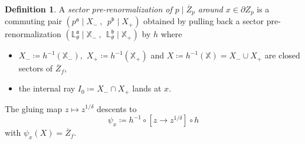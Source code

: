\documentclass[]{amsart}
\renewcommand{\sp}{{\ \ }}
\renewcommand{\aa}{{\mathfrak{a}}}
\newcommand{\bb}{{\mathfrak{b}}}
\newcommand{\Lbb}{{\mathbb L}}
\newcommand{\Sbb}{{\mathbb X}}
\theoremstyle{remark}
\numberwithin{equation}{section}
\theoremstyle{definition}
\newtheorem{defn}[thm]{Definition}
\begin{document}
\begin{defn}
\label{defn:SectRenormZp}
A \emph{sector pre-renormalization of $p\mid \overline Z_p$ around $x\in \partial Z_p$} is a commuting pair ${(p^\aa\mid X_-~,\sp  p^\bb \mid X_+)}$ obtained by pulling back a sector pre-renormalization $(\Lbb^\aa_\theta\mid \Sbb_-~,\sp  \Lbb_\theta^\bb \mid \Sbb_+)$ by $h$ where
\begin{itemize}
\item $X_-\coloneqq h^{-1}(\Sbb_-),$ $X_+\coloneqq h^{-1}(\Sbb_+)$ and $X\coloneqq h^{-1}(\Sbb)=X_-\cup X_+$ are closed sectors of $\overline Z_f$,
\item the internal ray $I_0\coloneqq X_-\cap X_+$  lands at $x$.
\end{itemize}
The gluing map $z\mapsto z^{1/\delta}$ descents to \[\psi_x\coloneqq h^{-1}\circ[z\to z^{1/\delta}] \circ h\] with $\psi_x(X)=\overline Z_f$. 
\end{defn}
\end{document}
